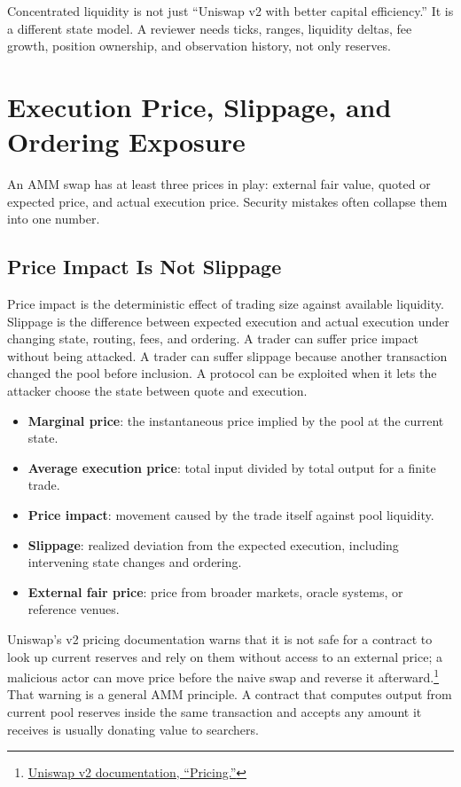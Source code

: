 Concentrated liquidity is not just ``Uniswap v2 with better capital efficiency.'' It is a different state model. A reviewer needs ticks, ranges, liquidity deltas, fee growth, position ownership, and observation history, not only reserves.

\section{Execution Price, Slippage, and Ordering Exposure}

An AMM swap has at least three prices in play: external fair value, quoted or expected price, and actual execution price. Security mistakes often collapse them into one number.

\subsection{Price Impact Is Not Slippage}

Price impact is the deterministic effect of trading size against available liquidity. Slippage is the difference between expected execution and actual execution under changing state, routing, fees, and ordering. A trader can suffer price impact without being attacked. A trader can suffer slippage because another transaction changed the pool before inclusion. A protocol can be exploited when it lets the attacker choose the state between quote and execution.

\begin{definitionbox}
\begin{itemize}
\item \textbf{Marginal price}: the instantaneous price implied by the pool at the current state.
\item \textbf{Average execution price}: total input divided by total output for a finite trade.
\item \textbf{Price impact}: movement caused by the trade itself against pool liquidity.
\item \textbf{Slippage}: realized deviation from the expected execution, including intervening state changes and ordering.
\item \textbf{External fair price}: price from broader markets, oracle systems, or reference venues.
\end{itemize}
\end{definitionbox}

Uniswap's v2 pricing documentation warns that it is not safe for a contract to look up current reserves and rely on them without access to an external price; a malicious actor can move price before the naive swap and reverse it afterward.\footnote{\href{https://developers.uniswap.org/docs/protocols/v2/concepts/pricing}{Uniswap v2 documentation, ``Pricing.''}} That warning is a general AMM principle. A contract that computes output from current pool reserves inside the same transaction and accepts any amount it receives is usually donating value to searchers.

